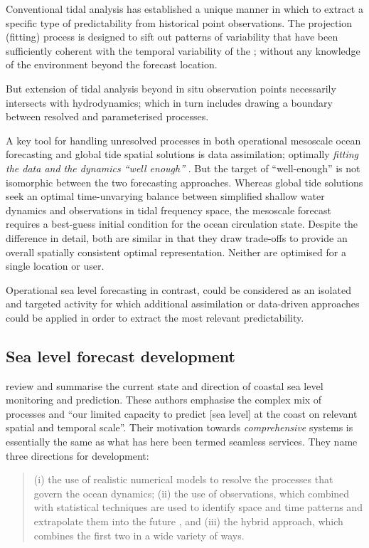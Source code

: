Conventional tidal analysis has established a unique manner in which to extract a specific type of predictability from historical point observations.
The projection (fitting) process is designed to sift out patterns of variability that have been sufficiently coherent with the temporal variability of the \ATGP{}; without any knowledge of the environment beyond the forecast location.

But extension of tidal analysis beyond in situ observation points necessarily intersects with hydrodynamics; which in turn includes drawing a boundary between resolved and parameterised processes.  

A key tool for handling unresolved processes in both operational mesoscale ocean forecasting and global tide spatial solutions is data assimilation; optimally \textit{fitting the data and the dynamics ``well enough''} \citep{Egbert:1994wz}. 
But the target of ``well-enough'' is not isomorphic between the two forecasting approaches.
Whereas global tide solutions seek an optimal time-unvarying balance between simplified shallow water dynamics and observations in tidal frequency space, the mesoscale forecast requires a best-guess initial condition for the ocean circulation state.  
Despite the difference in detail, both are similar in that they draw trade-offs to provide an overall spatially consistent optimal representation.   Neither are optimised for a single location or user.

Operational sea level forecasting in contrast, could be considered as an isolated and targeted activity for which additional assimilation or data-driven approaches could be applied in order to extract the most relevant predictability. 

\subsection{Sea level forecast development}
\citep{10.3389/fmars.2019.00437} review and summarise the current state and direction of coastal sea level monitoring and prediction.   These authors emphasise the complex mix of processes and ``our limited capacity to predict [sea level] at the coast on relevant spatial and temporal scale''.
Their motivation towards \emph{comprehensive} systems is essentially the same as what has here been termed seamless services. 
They name three directions for development:
\begin{quote}
(i) the use of realistic numerical models to resolve the processes that govern the ocean dynamics; (ii) the use of observations, which combined with statistical techniques are used to identify space and time patterns and extrapolate them into the future , and (iii) the hybrid approach, which combines the first two in a wide variety of ways.
\end{quote} 

